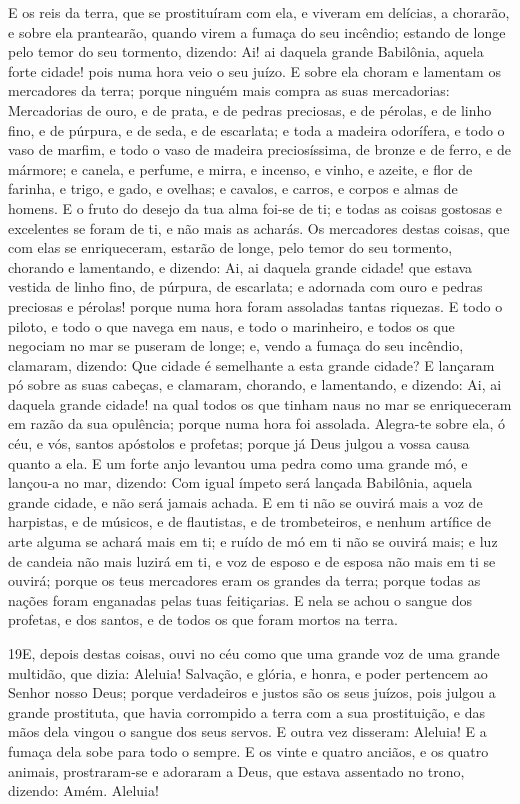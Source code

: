 E os reis da terra, que se prostituíram com ela, e viveram em
delícias, a chorarão, e sobre ela prantearão, quando virem a fumaça
do seu incêndio; estando de longe pelo temor do seu tormento,
dizendo: Ai! ai daquela grande Babilônia, aquela forte cidade! pois
numa hora veio o seu juízo. E sobre ela choram e lamentam os
mercadores da terra; porque ninguém mais compra as suas mercadorias:
Mercadorias de ouro, e de prata, e de pedras preciosas, e de
pérolas, e de linho fino, e de púrpura, e de seda, e de escarlata; e
toda a madeira odorífera, e todo o vaso de marfim, e todo o vaso de
madeira preciosíssima, de bronze e de ferro, e de mármore; e
canela, e perfume, e mirra, e incenso, e vinho, e azeite, e flor de
farinha, e trigo, e gado, e ovelhas; e cavalos, e carros, e corpos e
almas de homens. E o fruto do desejo da tua alma foi-se de
ti; e todas as coisas gostosas e excelentes se foram de ti, e não
mais as acharás. Os mercadores destas coisas, que com elas se
enriqueceram, estarão de longe, pelo temor do seu tormento, chorando
e lamentando, e dizendo: Ai, ai daquela grande cidade! que
estava vestida de linho fino, de púrpura, de escarlata; e adornada
com ouro e pedras preciosas e pérolas! porque numa hora foram
assoladas tantas riquezas. E todo o piloto, e todo o que
navega em naus, e todo o marinheiro, e todos os que negociam no mar
se puseram de longe; e, vendo a fumaça do seu incêndio,
clamaram, dizendo: Que cidade é semelhante a esta grande cidade?
E lançaram pó sobre as suas cabeças, e clamaram, chorando, e
lamentando, e dizendo: Ai, ai daquela grande cidade! na qual todos
os que tinham naus no mar se enriqueceram em razão da sua opulência;
porque numa hora foi assolada. Alegra-te sobre ela, ó céu, e
vós, santos apóstolos e profetas; porque já Deus julgou a vossa
causa quanto a ela. E um forte anjo levantou uma pedra como
uma grande mó, e lançou-a no mar, dizendo: Com igual ímpeto será
lançada Babilônia, aquela grande cidade, e não será jamais achada.
E em ti não se ouvirá mais a voz de harpistas, e de músicos,
e de flautistas, e de trombeteiros, e nenhum artífice de arte alguma
se achará mais em ti; e ruído de mó em ti não se ouvirá mais;
e luz de candeia não mais luzirá em ti, e voz de esposo e de
esposa não mais em ti se ouvirá; porque os teus mercadores eram os
grandes da terra; porque todas as nações foram enganadas pelas tuas
feitiçarias. E nela se achou o sangue dos profetas, e dos
santos, e de todos os que foram mortos na terra.

\medskip

\lettrine{19} E, depois destas coisas, ouvi no céu como que
uma grande voz de uma grande multidão, que dizia: Aleluia! Salvação,
e glória, e honra, e poder pertencem ao Senhor nosso Deus;
porque verdadeiros e justos são os seus juízos, pois julgou a
grande prostituta, que havia corrompido a terra com a sua
prostituição, e das mãos dela vingou o sangue dos seus servos. E
outra vez disseram: Aleluia! E a fumaça dela sobe para todo o
sempre. E os vinte e quatro anciãos, e os quatro animais,
prostraram-se e adoraram a Deus, que estava assentado no trono,
dizendo: Amém. Aleluia!

